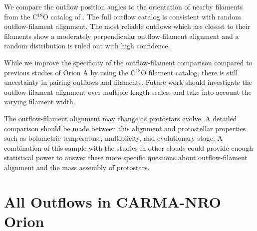 \documentclass[twocolumn]{aastex63}
\begin{document}
We compare the outflow position angles to the orientation of nearby filaments from the C$^{18}$O catalog of \citet{Suri19}. The full outflow catalog is consistent with random outflow-filament alignment. The most reliable outflows which are closest to their filaments show a moderately perpendicular outflow-filament alignment and a random distribution is ruled out with high confidence.


While we improve the specificity of the outflow-filament comparison compared to previous studies of Orion A by using the C$^{18}$O filament catalog, there is still uncertainty in pairing outflows and filaments. Future work should investigate the outflow-filament alignment over multiple length scales, and take into account the varying filament width.

The outflow-filament alignment may change as protostars evolve. A detailed comparison should be made between this alignment and protostellar properties such as bolometric temperature, multiplicity, and evolutionary stage. A combination of this sample with the studies in other clouds could provide enough statistical power to answer these more specific questions about outflow-filament alignment and the mass assembly of protostars.

\startlongtable

\startlongtable

\startlongtable








\appendix

\section{All Outflows in CARMA-NRO Orion}\label{sec:appendix}

% 
\end{document}
